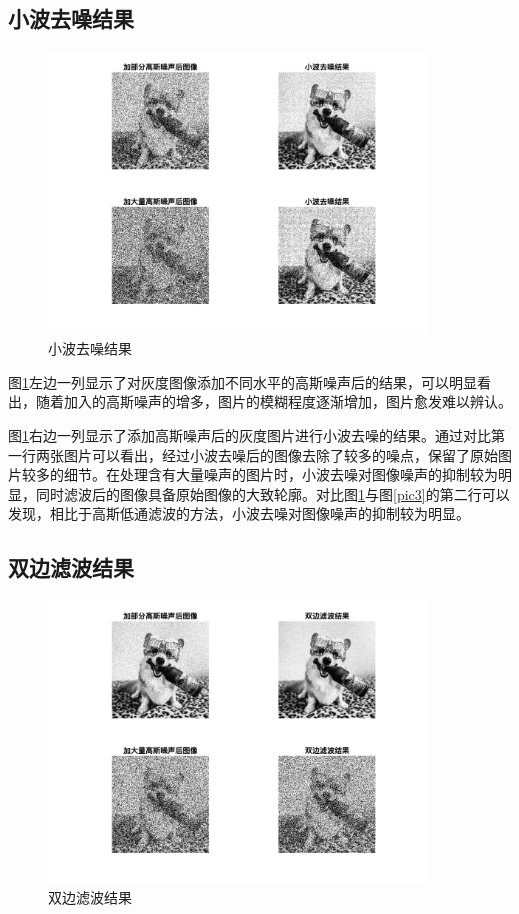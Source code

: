 \documentclass[conference]{IEEEtran}
\begin{document}
\subsection{小波去噪结果}
\begin{figure}[htbp]
	\centerline{
		\includegraphics[width=10cm]{LW滤波结果.png} 	
	}
	\caption{小波去噪结果}
	\label{pic4}
\end{figure}

图\ref{pic4}左边一列显示了对灰度图像添加不同水平的高斯噪声后的结果，可以明显看出，随着加入的高斯噪声的增多，图片的模糊程度逐渐增加，图片愈发难以辨认。

图\ref{pic4}右边一列显示了添加高斯噪声后的灰度图片进行小波去噪的结果。通过对比第一行两张图片可以看出，经过小波去噪后的图像去除了较多的噪点，保留了原始图片较多的细节。在处理含有大量噪声的图片时，小波去噪对图像噪声的抑制较为明显，同时滤波后的图像具备原始图像的大致轮廓。对比图\ref{pic4}与图\ref{pic3}的第二行可以发现，相比于高斯低通滤波的方法，小波去噪对图像噪声的抑制较为明显。

\subsection{双边滤波结果}
\begin{figure}[htbp]
	\centerline{
		\includegraphics[width=10cm]{DF滤波结果.png} 	
	}
	\caption{双边滤波结果}
	\label{pic5}
\end{figure}
\end{document}
